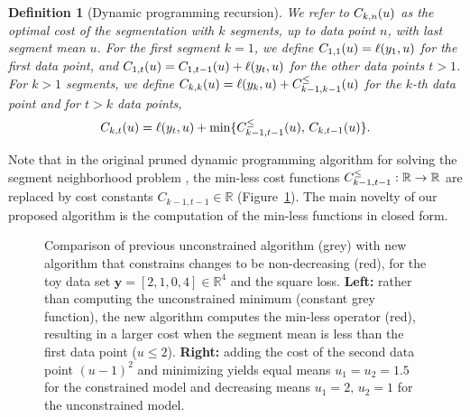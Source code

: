 \documentclass{article}
\newtheorem{definition}{Definition}
\newcommand{\RR}{\mathbb R}
\begin{document}
\begin{definition}[Dynamic programming recursion]
\label{def:fcc}
  We refer to $C_{k,n}(u)$ as the optimal cost of the segmentation
  with $k$ segments, up to data point $n$, with last segment mean
  $u$. For the first segment $k=1$, we define
  $C_{1,1}(u)=\ell(y_1,u)$ for the first data point, and
  $C_{1,t}(u)=C_{1,t-1}(u)+\ell(y_t,u)$ for the other data
  points $t>1$. For $k>1$ segments, we define
  $C_{k,k}(u)=\ell(y_k, u)+C_{k-1,k-1}^\leq(u)$ for the $k$-th
  data point and for $t>k$ data points,
  \begin{equation}
\nonumber
  C_{k,t}(u)=\ell(y_t,u)+
  \min\{
  C_{k-1,t-1}^\leq(u),\,
  C_{k,t-1}(u)
  \}.
  \end{equation}
\end{definition}
Note that in the original pruned dynamic programming algorithm for
solving the segment neighborhood problem \citep{pruned-dp}, the
min-less cost functions $\FCC_{k-1,t-1}^\leq:\RR\rightarrow\RR$ are
replaced by cost constants $C_{k-1,t-1}\in\RR$
(Figure~\ref{fig:compare-unconstrained}). The main novelty of our
proposed algorithm is the computation of the min-less functions in
closed form.

\begin{figure}
  \centering
  
  
  \vskip -0.5cm
  \caption{Comparison of previous unconstrained algorithm (grey) with
    new algorithm that constrains changes to be non-decreasing (red),
    for the toy data set $\mathbf y= [ 2, 1, 0, 4 ] \in\RR^4$ and the
    square loss. \textbf{Left:} rather than computing the
    unconstrained minimum (constant grey function), the new algorithm
    computes the min-less operator (red), resulting in a larger cost
    when the segment mean is less than the first data point
    ($u\leq 2$). \textbf{Right:} adding the cost of the second data
    point $(u-1)^2$ and minimizing yields equal means
    $u_1=u_2=1.5$ for the constrained model and decreasing 
    means $u_1=2,\, u_2=1$ for the unconstrained model.}
  \label{fig:compare-unconstrained}
\end{figure}
\end{document}
